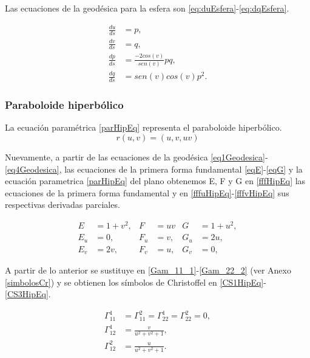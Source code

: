 \documentclass{endm}
\begin{document}
Las ecuaciones de la geod\'esica para la esfera son \ref{eq:duEsfera}-\ref{eq:dqEsfera}.

{\small
\begin{align}
\frac{du}{ds}&=p,\label{eq:duEsfera} \\
\frac{dv}{ds}&=q,\label{eq:dvEsfera}     \\
\frac{dp}{ds}&=\frac{-2cos(v)}{sen(v)} pq, \label{eq:dpEsfera}\\ 
\frac{dq}{ds}&= sen(v)cos(v) p^2. \label{eq:dqEsfera}
\end{align}
}

\subsubsection{Paraboloide hiperb\'olico}

La ecuaci\'on param\'etrica \ref{parHipEq} representa el paraboloide hiperb\'olico.
{\small
\begin{equation} \label{parHipEq}
r(u,v) = (u,v,uv)
\end{equation}
}

Nuevamente, a partir de las ecuaciones de la geod\'esica \ref{eq1Geodesica}-\ref{eq4Geodesica}, las ecuaciones de la primera forma fundamental \ref{eqE}-\ref{eqG} y la ecuaci\'on parametrica \ref{parHipEq} del plano obtenemos E, F y G en \ref{fffHipEq} las ecuaciones de la primera forma fundamental y en \ref{fffuHipEq}-\ref{fffvHipEq} sus respectivas derivadas parciales.

{\small
\begin{align}
E&=1+v^2,   & F &=uv    & G&=1+u^2, \label{fffHipEq} \\
E_u&=0,     & F_u&=v,   & G_u&=2u, \label{fffuHipEq}\\
E_v&=2v,    & F_v&=u,   & G_v&=0, \label{fffvHipEq}
\end{align}
}

A partir de lo anterior se sustituye en \ref{Gam_11_1}-\ref{Gam_22_2} (ver Anexo \ref{simbolosCr}) y se obtienen los s\'imbolos de Christoffel en \ref{CS1HipEq}-\ref{CS3HipEq}.

{\small
\begin{align}
\Gamma_{11}^1&=\Gamma_{11}^2=\Gamma_{22}^1=\Gamma_{22}^2=0, \label{CS1HipEq} \\
\Gamma_{12}^1&=\frac{v}{u^2+v^2+1},  \label{CS2HipEq}   \\
\Gamma_{12}^2&=\frac{u}{u^2+v^2+1}.  \label{CS3HipEq}
\end{align}
}
\end{document}
